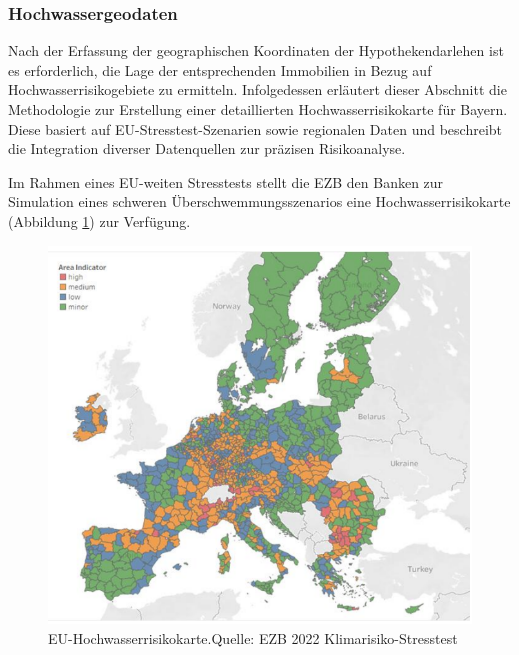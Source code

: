 \subsubsection{Hochwassergeodaten}
Nach der Erfassung der geographischen Koordinaten der Hypothekendarlehen ist es erforderlich, die Lage der entsprechenden Immobilien in Bezug auf Hochwasserrisikogebiete zu ermitteln. Infolgedessen erläutert dieser Abschnitt die Methodologie zur Erstellung einer detaillierten Hochwasserrisikokarte für Bayern. Diese basiert auf EU-Stresstest-Szenarien sowie regionalen Daten und beschreibt die Integration diverser Datenquellen zur präzisen Risikoanalyse.

Im Rahmen eines EU-weiten Stresstests stellt die \ac{EZB} den Banken zur Simulation eines schweren Überschwemmungsszenarios eine Hochwasserrisikokarte (Abbildung \ref{fig:euflut}) zur Verfügung.

\begin{figure}[htbp]
    \centering
    \includegraphics[width=\textwidth]{figures/euflood.png} 
    \caption{EU-Hochwasserrisikokarte.Quelle: EZB 2022 Klimarisiko-Stresstest}
    \label{fig:euflut}
\end{figure}
\FloatBarrier

